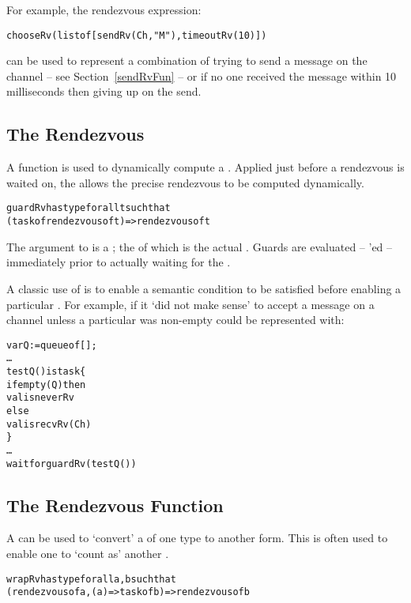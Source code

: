 For example, the rendezvous expression:
\begin{alltt}
chooseRv(list of [sendRv(Ch,"M"), timeoutRv(10)])
\end{alltt}
can be used to represent a combination of trying to send a message on the  channel -- see Section~\vref{sendRvFun} -- or if no one received the message within 10 milliseconds then giving up on the send.

\subsection{The  Rendezvous}
\label{guardRvFun}

A  function is used to dynamically compute a . Applied just before a rendezvous is waited on, the  allows the precise rendezvous to be computed dynamically.

\begin{alltt}
guardRv has type for all t such that
                 (task of rendezvous of t) => rendezvous of t
\end{alltt}

The argument to  is a ; the  of which is the actual . Guards are evaluated -- 'ed -- immediately prior to actually waiting for the . 

A classic use of  is to enable a semantic condition to be satisfied before enabling a particular . For example, if it `did not make sense' to accept a message on a channel unless a particular  was non-empty could be represented with:
\begin{alltt}
var Q := queue of [];
\ldots
testQ() is task\{
  if empty(Q) then
    valis neverRv
  else
    valis recvRv(Ch)
\}
\ldots
wait for guardRv(testQ())
\end{alltt}

\subsection{The  Rendezvous Function}
\label{wrapRvFun}

A  can be used to `convert' a  of one type to another form. This is often used to enable one  to `count as' another .

\begin{alltt}
wrapRv has type for all a,b such that 
                (rendezvous of a, (a) => task of b) => rendezvous of b
\end{alltt}

